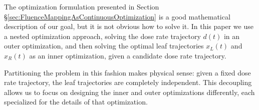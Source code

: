 The optimization formulation presented in Section \S \ref{sec:FluenceMappingAsContinuousOptimization}
is a good mathematical description of our goal, but it is not obvious how to solve it.
In this paper we use a nested optimization approach,
solving the dose rate trajectory $d(t)$ in an outer optimization,
and then solving the optimal leaf trajectories $x_L(t)$ and $x_R(t)$ as an inner optimization,
given a candidate dose rate trajectory.

Partitioning the problem in this fashion makes physical sense: given a fixed dose rate trajectory,
the leaf trajectories are completely independent.
This decoupling allows us to focus on designing the inner and outer optimizations differently,
each specialized for the details of that optimization.






